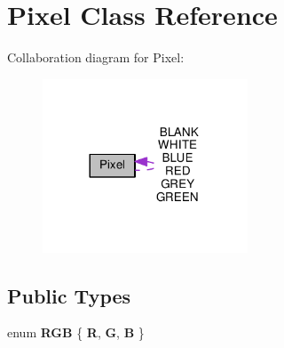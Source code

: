 \hypertarget{class_pixel}{}\section{Pixel Class Reference}
\label{class_pixel}


Collaboration diagram for Pixel\+:
\nopagebreak
\begin{figure}[H]
\begin{center}
\leavevmode
\includegraphics[width=173pt]{class_pixel__coll__graph}
\end{center}
\end{figure}
\subsection*{Public Types}
\begin{DoxyCompactItemize}
\item 
enum {\bfseries R\+GB} \{ {\bfseries R}, 
{\bfseries G}, 
{\bfseries B}
 \}\hypertarget{class_pixel_ac2ab5194684b31a50d429b26a0569ed9}{}\label{class_pixel_ac2ab5194684b31a50d429b26a0569ed9}

\end{DoxyCompactItemize}
